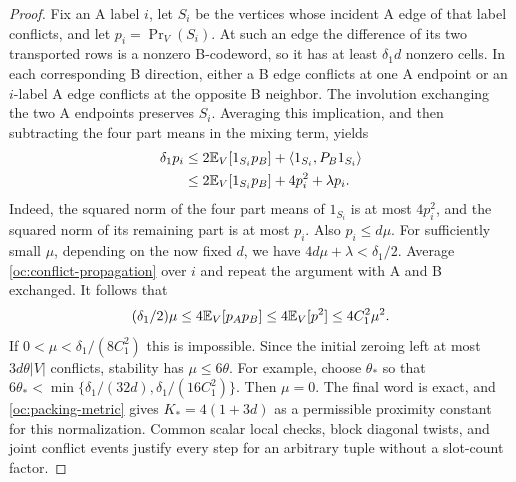 \begin{proof}
Fix an A label $i$, let $S_i$ be the vertices whose incident A edge
of that label conflicts, and let $p_i=\Pr_V(S_i)$.  At such an edge
the difference of its two transported rows is a nonzero B-codeword,
so it has at least $\delta_1d$ nonzero cells.  In each corresponding
B direction, either a B edge conflicts at one A endpoint or an
$i$-label A edge conflicts at the opposite B neighbor.  The
involution exchanging the two A endpoints preserves $S_i$.  Averaging
this implication, and then subtracting the four part means in the
mixing term, yields
\begin{align}
 \delta_1p_i
 &\le 2\mathbb{E}_V[1_{S_i}p_B]
      +\langle1_{S_i},P_B1_{S_i}\rangle \notag\\
 &\le 2\mathbb{E}_V[1_{S_i}p_B]+4p_i^2+\lambda p_i.
 \label{oc:conflict-propagation}
\end{align}
Indeed, the squared norm of the four part means of $1_{S_i}$ is at
most $4p_i^2$, and the squared norm of its remaining part is at most
$p_i$.  Also $p_i\le d\mu$.  For sufficiently small $\mu$, depending
on the now fixed $d$, we have $4d\mu+\lambda<\delta_1/2$.
Average \eqref{oc:conflict-propagation} over $i$ and repeat the
argument with A and B exchanged.  It follows that
\begin{equation}\label{oc:stable-zero}
 (\delta_1/2)\mu
 \le4\mathbb{E}_V[p_Ap_B]\le4\mathbb{E}_V[p^2]\le4C_1^2\mu^2.
\end{equation}
If $0<\mu<\delta_1/(8C_1^2)$ this is impossible.  Since the initial
zeroing left at most $3d\theta|V|$ conflicts, stability has
$\mu\le6\theta$.  For example, choose $\theta_*$ so that
$6\theta_*<\min\{\delta_1/(32d),\delta_1/(16C_1^2)\}$.
Then $\mu=0$.  The final word is exact, and
\eqref{oc:packing-metric} gives $K_*=4(1+3d)$ as a permissible
proximity constant for this normalization.  Common scalar local
checks, block diagonal twists, and joint conflict events justify
every step for an arbitrary tuple without a slot-count factor.
\end{proof}

